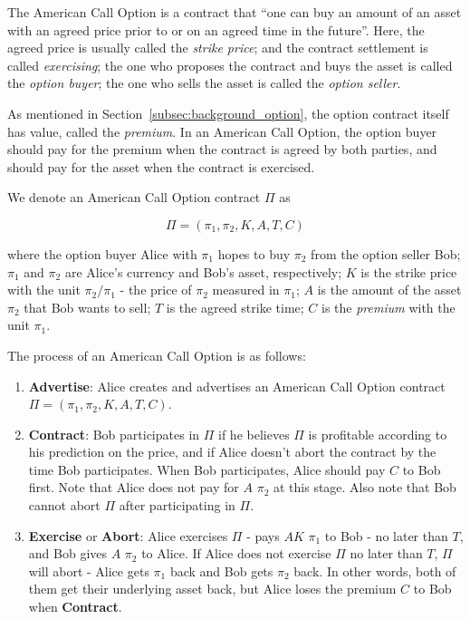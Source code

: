 The American Call Option is a contract that ``one can buy an amount of an asset with an agreed price prior to or on an agreed time in the future''. 
Here,
the agreed price is usually called the \textit{strike price};
and the contract settlement is called \textit{exercising};
the one who proposes the contract and buys the asset is called the \textit{option buyer};
the one who sells the asset is called the \textit{option seller}.

As mentioned in Section~\ref{subsec:background_option}, the option contract itself has value, called the \textit{premium}.
In an American Call Option, the option buyer should pay for the premium when the contract is agreed by both parties, and should pay for the asset when the contract is exercised.

We denote an American Call Option contract $\Pi$ as

$$\Pi = (\pi_1, \pi_2, K, A, T, C)$$

where
the option buyer Alice with $\pi_1$ hopes to buy $\pi_2$ from the option seller Bob;
$\pi_1$ and $\pi_2$ are Alice's currency and Bob's asset, respectively; 
$K$ is the strike price with the unit $\pi_2 / \pi_1$ - the price of $\pi_2$ measured in $\pi_1$;
$A$ is the amount of the asset $\pi_2$ that Bob wants to sell;
$T$ is the agreed strike time;
$C$ is the \textit{premium} with the unit $\pi_1$.

The process of an American Call Option is as follows:

\begin{enumerate}
    \item \textbf{Advertise}: Alice creates and advertises an American Call Option contract $\Pi = (\pi_1, \pi_2, K, A, T, C)$.
    \item \textbf{Contract}: Bob participates in $\Pi$ if he believes $\Pi$ is profitable according to his prediction on the price, and if Alice doesn't abort the contract by the time Bob participates.
    When Bob participates, Alice should pay $C$ to Bob first.
    Note that Alice does not pay for $A$ $\pi_2$ at this stage.
    Also note that Bob cannot abort $\Pi$ after participating in $\Pi$.
    \item \textbf{Exercise} or \textbf{Abort}: Alice exercises $\Pi$ - pays $AK$ $\pi_1$ to Bob - no later than $T$, and Bob gives $A$ $\pi_2$ to Alice.
    If Alice does not exercise $\Pi$ no later than $T$, $\Pi$ will abort - Alice gets $\pi_1$ back and Bob gets $\pi_2$ back.
    In other words, both of them get their underlying asset back, but Alice loses the premium $C$ to Bob when \textbf{Contract}.
\end{enumerate}












